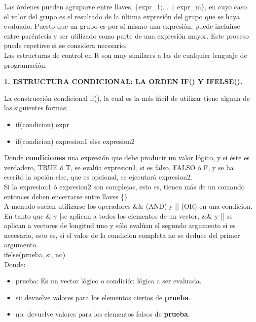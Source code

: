\documentclass[12pt,letterpaper]{article}\usepackage[]{graphicx}\usepackage[]{color}
\begin{document}
Las \'ordenes pueden agruparse entre llaves, \{expr\_1;. . .; expr\_m\}, en cuyo caso el valor del grupo es el resultado de la \'ultima expresi\'on del grupo que se haya evaluado. Puesto que un grupo es por s\'i mismo una expresi\'on, puede incluirse entre par\'entesis y ser utilizado como parte de una expresi\'on mayor. Este proceso puede repetirse si se considera necesario.\\

Las estructuras de control en R son muy similares a las de cualquier lenguaje de programaci\'on.\\

\begin{center}
\textbf{1.  ESTRUCTURA CONDICIONAL: LA ORDEN IF() Y IFELSE().}
\end{center}

La construcci\'on condicional if(), la cual es la m\'as f\'acil de utilizar tiene alguna de las siguientes formas:\\

\begin{itemize}
\item if(condicion) expr 
\item if(condicion) expresion1 else expresion2 
\end{itemize}

Donde \textbf{condiciones} una expresi\'on que debe producir un valor l\'ogico, y si \'este es verdadero, TRUE \'o T, se eval\'ua expresion1, si es falso, FALSO \'o F, y se ha escrito la opci\'on else, que es opcional, se ejecutar\'a expresion2.\\

Si la expresion1 \'o expresion2 son complejas, esto es, tienen m\'as de un comando entonces deben encerrarse entre llaves \{\\}\\

A menudo suelen utilizarse los operadores \&\& (AND) y || (OR) en una condicion. En tanto que \& y |se aplican a todos los elementos de un vector, \&\& y || se aplican a vectores de longitud uno y s\'olo eval\'uan el segundo argumento si es necesario, esto es, si el valor de la condicion completa no se deduce del primer argumento.\\

ifelse(prueba, si, no)\\

Donde: 
\begin{itemize}
\item prueba: Es un vector l\'ogico o condici\'on l\'ogica a ser evaluada.
\item si: devuelve valores para los elementos ciertos de \textbf{prueba}.
\item no: devuelve valores para los elementos falsos de \textbf{prueba}.
\end{itemize}
\end{document}
